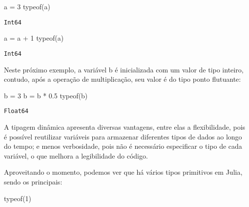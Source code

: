 \documentclass[
  letterpaper,
  DIV=11,
  numbers=noendperiod]{scrreprt}
\newenvironment{Shaded}{\begin{snugshade}}{\end{snugshade}}
\newcommand{\FloatTok}[1]{\textcolor[rgb]{0.68,0.00,0.00}{#1}}
\newcommand{\FunctionTok}[1]{\textcolor[rgb]{0.28,0.35,0.67}{#1}}
\newcommand{\NormalTok}[1]{\textcolor[rgb]{0.00,0.23,0.31}{#1}}
\newcommand{\OperatorTok}[1]{\textcolor[rgb]{0.37,0.37,0.37}{#1}}
\begin{document}
\begin{Shaded}
\begin{Highlighting}[]
\NormalTok{a }\OperatorTok{=} \FloatTok{3}
\FunctionTok{typeof}\NormalTok{(a)}
\end{Highlighting}
\end{Shaded}

\begin{verbatim}
Int64
\end{verbatim}

\begin{Shaded}
\begin{Highlighting}[]
\NormalTok{a }\OperatorTok{=}\NormalTok{ a }\OperatorTok{+} \FloatTok{1}
\FunctionTok{typeof}\NormalTok{(a)}
\end{Highlighting}
\end{Shaded}

\begin{verbatim}
Int64
\end{verbatim}

Neste próximo exemplo, a variável b é inicializada com um valor de tipo
inteiro, contudo, após a operação de multiplicação, seu valor é do tipo
ponto flutuante:

\begin{Shaded}
\begin{Highlighting}[]
\NormalTok{b }\OperatorTok{=} \FloatTok{3}
\NormalTok{b }\OperatorTok{=}\NormalTok{ b }\OperatorTok{*} \FloatTok{0.5}
\FunctionTok{typeof}\NormalTok{(b)}
\end{Highlighting}
\end{Shaded}

\begin{verbatim}
Float64
\end{verbatim}

A tipagem dinâmica apresenta diversas vantagens, entre elas a
flexibilidade, pois é possível reutilizar variáveis para armazenar
diferentes tipos de dados ao longo do tempo; e menos verbosidade, pois
não é necessário especificar o tipo de cada variável, o que melhora a
legibilidade do código.

Aproveitando o momento, podemos ver que há vários tipos primitivos em
Julia, sendo os principais:

\begin{Shaded}
\begin{Highlighting}[]
\FunctionTok{typeof}\NormalTok{(}\FloatTok{1}\NormalTok{)}
\end{Highlighting}
\end{Shaded}
\end{document}
